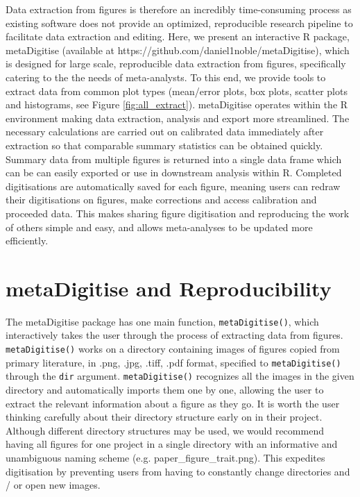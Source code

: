 \documentclass[12pt]{article}
\newcommand{\code}[1]{\texttt{#1}}
\newcommand{\fct}[1]{\texttt{#1()}}
\newcommand{\pkg}[1]{{\fontseries{b}\selectfont #1}}
\let\proglang=\textsf
\begin{document}
Data extraction from figures is therefore an incredibly time-consuming process as existing software does not provide an optimized, reproducible research pipeline to facilitate data extraction and editing. Here, we present an interactive \proglang{R} package, \pkg{metaDigitise} (available at https://github.com/daniel1noble/metaDigitise), which is designed for large scale, reproducible data extraction from figures, specifically catering to the the needs of meta-analysts. To this end, we provide tools to extract data from common plot types (mean/error plots, box plots, scatter plots and histograms, see Figure \ref{fig:all_extract}). \pkg{metaDigitise} operates within the \proglang{R} environment making data extraction, analysis and export more streamlined. The necessary calculations are carried out on calibrated data immediately after extraction so that comparable summary statistics can be obtained quickly. Summary data from multiple figures is returned into a single data frame which can be can easily exported or use in downstream analysis within \proglang{R}. Completed digitisations are automatically saved for each figure, meaning users can redraw their digitisations on figures, make corrections and access calibration and proceeded data. This makes sharing figure digitisation and reproducing the work of others simple and easy, and allows meta-analyses to be updated more efficiently.




\section{\pkg{metaDigitise} and Reproducibility}
The \pkg{metaDigitise} package has one main function, \fct{metaDigitise}, which interactively takes the user through the process of extracting data from figures. \fct{metaDigitise} works on a directory containing images of figures copied from primary literature, in .png, .jpg, .tiff, .pdf format, specified to \fct{metaDigitise} through the \code{dir} argument. \fct{metaDigitise} recognizes all the images in the given directory and automatically imports them one by one, allowing the user to extract the relevant information about a figure as they go. It is worth the user thinking carefully about their directory structure early on in their project. Although different directory structures may be used, we would recommend having all figures for one project in a single directory with an informative and unambiguous naming scheme (e.g. paper\_figure\_trait.png). This expedites digitisation by preventing users from having to constantly change directories and / or open new images. 
\end{document}
